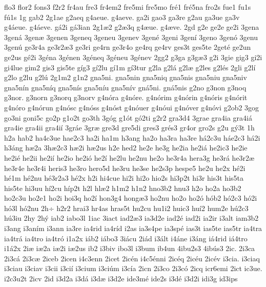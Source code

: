 {flo3
flor2
fons3
f2r2
fr4au
fre3
fr4em2
fre5mi
fre5mo
fr^^e91
fr^^e95na
fro2s
fue1
fu1s
f^^fa1s
1g
gab2
2g1ae
g2aeq
g4aeue.
g4aeve.
ga2i
gao3
ga3re
g2au
ga3ue
ga3v
g4^^e1eue.
g4^^e1eve.
g^^e12i
g^^e13ian
2g1^^e62
g2^^e63q
g4^^e6ue.
g4^^e6ve.
2gd
g2e
ge2e
ge2i
3gena
3gen^^e1
3gen^^e6
3genen
3geneq
3geneu
3genev
3gen^^e9
3geni
3gen^^ed
3geno
3gen^^f3
3genu
3gen^^fa
ge3r4a
ge3r2^^e63
ge3ri
ge4rn
ge3r4o
ge4rq
ge4rv
ges3t
ges5te
2get^^e9
ge2un
ge2us
g^^e92i
3g^^e9na
3g^^e9nen
3g^^e9neq
3g^^e9neu
3g^^e9nev
2gg2
g3ga
g3g^^e63
g2i
3gie
gig3
gi2i
gi4lue
gim2
gis3
gis5te
g^^edg3
g^^ed2lu
g^^ed1m
g^^ed3tur
g2la
g2l^^e1
g2l^^e6
g2les
g2l^^e9s
2gli
g2l^^ed
g2lo
g2lu
g2l^^fa
2g1m2
g1n2
gna5ni.
gna5nin
gna5niq
gna5nis
gna5niu
gna5niv
gna5n^^edn
gna5n^^edq
gna5n^^eds
gna5n^^edu
gna5n^^edv
gn^^e15ni.
gn^^e15nis
g2no
g3non
g3noq
g3nor.
g3norn
g3norq
g3norv
g4n^^f3ra
g4n^^f3re.
g4n^^f3rim
g4n^^f3rin
g4n^^f3ris
g4n^^f3rit
g4n^^f3ro
g4n^^f3run
g4n^^f3sc
g4n^^f3ss
g4n^^f3st
g4n^^f3uer
g4n^^f3ui
g4n^^f3ver
g4n^^f3vi
g2ob2
3gog
go3ni
goni5c
go2p
g1o2t
go3th
3g^^f3g
g1^^f3t
g^^f32ti
g2r2
gra3d4
3grae
gra4ia
gra4i^^e1
gra4ie
gra4ii
gra4i^^ed
3gr^^e1e
3gr^^e6
gre3d
gre5di
gres3
gr^^e9s3
gr4or
gro2s
g2u
g^^fd3t
1h
h2a
hab2
ha4c3ue
hae2c3
ha2i
ha1m
h3ang
ha2o
ha3ra
ha3re
h^^e12c3u
h^^e1e2c3
h^^e12i
h3^^e1ng
h^^e62a
3h^^e62c3
h^^e62i
h^^e62us
h2e
hed2
he2e
he3g
he2ia
he2i^^e1
he2ic3
he2ie
he2i^^e9
he2ii
he2i^^ed
he2io
he2i^^f3
he2^^ed
he2lu
he2nu
he2o
he3r4a
hera3g
he3r^^e1
he3r2^^e6
he3r4e
he3r4i
heris3
he3ro
hero5d
he3ru
he3se
he2s3p
hespe5
he2u
he2x
h^^e92i
h^^e91m
h^^e92nu
h^^e93r2a3
h^^e92x
h2i
hi4cue
hi2i
hi2o
hio2s
hi3p2t
hi3r
his3t
his5ta
his5te
hi3uu
h^^ed2cu
h^^edp2t
h2l
hl^^e62
h1m2
h1n2
hno3b2
hnu3
h2o
ho2a
ho3b2
ho2c3u
ho2e1
ho2i
hoi3q
ho2^^ed
hon3g4
hong^^e63
ho2nu
ho2o
ho2^^f3
h^^f3b2
h^^f32c3
h^^f32i
h^^f33l
h^^f32nu
2h^^f7
h2r2
hrai3
hr4as
hras5t
hu2cu
hu1i2
huic3
hu^^ed2
hum2e
h^^fa2c3
h^^fa3iu
2hy
2h^^fd
iab2
iabo3l
1iac
3iact
iad2^^e63
ia3d2e
iad2^^e9
iad2i
ia2ir
i3alt
iam3b2
i3ang
i3an^^edm
i3ann
ia3re
ia4rid
ia4r^^edd
i2as
ia3s4pe
ia3sp^^e9
ias3t
ias5te
ias5tr
ia4tra
ia4tr^^e1
ia4tro
ia4tr^^f3
i1a2x
i^^e1b2
i^^e1bo3
3i^^e1cu
2i^^e1d
i3^^e1lt
i4^^e1ne
i3^^e1ng
i^^e14rid
i^^e14tro
i1^^e12x
2i^^e6
i^^e62a
i^^e62i
i^^e62us
ib2
i3biv
ibo3l
i3bum
ib4un
4ibu2s3
4ib^^fas3
2ic.
2i3ca
2i3c^^e1
2i3c^^e6
2iceb
2icen
i4c3enn
2icet
2ic^^e9n
i4c5^^e9nni
2ic^^e9q
2ic^^e9u
2ic^^e9v
i3cia.
i3ciaq
i3ciau
i3ciav
i3cii
i3ci^^ed
i3cium
i3ci^^fam
i3c^^eda
2icn
2i3co
2i3c^^f3
2icq
icr6emi
2ict
ic3ue.
i2c3u2t
2icv
2id
i3d2a
i3d^^e1
i3d^^e6
i3d2e
ide3m^^e9
ide2s
i3d^^e9
i3d2i
idi3g
id3ips
}
